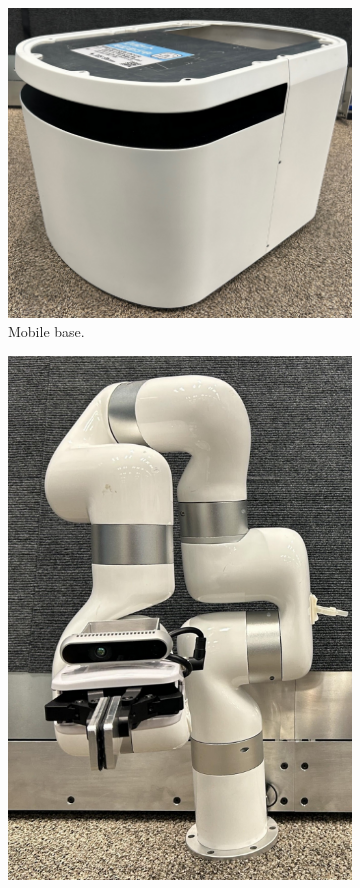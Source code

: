 \documentclass[runningheads,a4paper]{llncs}
\begin{document}
\begin{figure}[tbp]
\begin{minipage}[b]{0.25\linewidth}
\begin{subfigure}[b]{\linewidth}
			\includegraphics[width=\linewidth]{images/component_base.png}
			\caption{Mobile base.}
			\label{fig:component_base}
		\end{subfigure}
		\begin{subfigure}[b]{\linewidth}
			\includegraphics[width=\linewidth]{images/component_manipulator.png}

\end{subfigure}
\end{minipage}
\end{figure}
\end{document}
